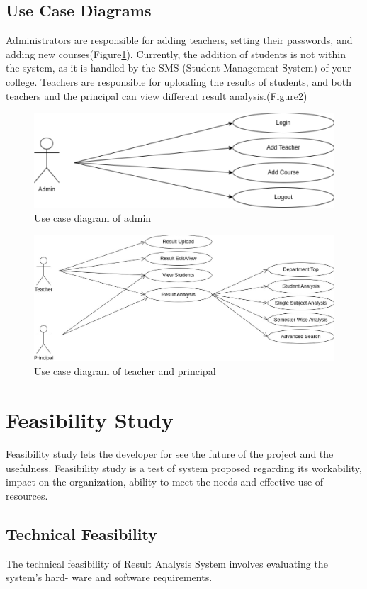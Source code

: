 \documentclass{nascproject}
\begin{document}
\subsection{Use Case Diagrams}
	Administrators are responsible for adding teachers, setting their passwords, and adding new courses(Figure\ref{usecase1}). Currently, the addition of students is not within the system, as it is handled by the SMS (Student Management System) of your college. Teachers are responsible for uploading the results of students, and both teachers and the principal can view different result analysis.(Figure\ref{usecase2})
\begin{figure}[H]
	\centering
	\includegraphics[scale=0.6]{usecase1.png}
	\caption{Use case diagram of admin}
	\label{usecase1}
\end{figure}
\begin{figure}[H]
	\centering
	\includegraphics[scale=0.4]{usecase2.jpg}
	\caption{Use case diagram of teacher and principal}
	\label{usecase2}
\end{figure}
\section{Feasibility Study}
Feasibility study lets the developer for see the future of the project and the usefulness.
Feasibility study is a test of system proposed regarding its workability, impact on the
organization, ability to meet the needs and effective use of resources.

    \subsection {Technical Feasibility}
    The technical feasibility of Result Analysis System involves evaluating the system’s hard-
    ware and software requirements.\\
    
\end{document}
